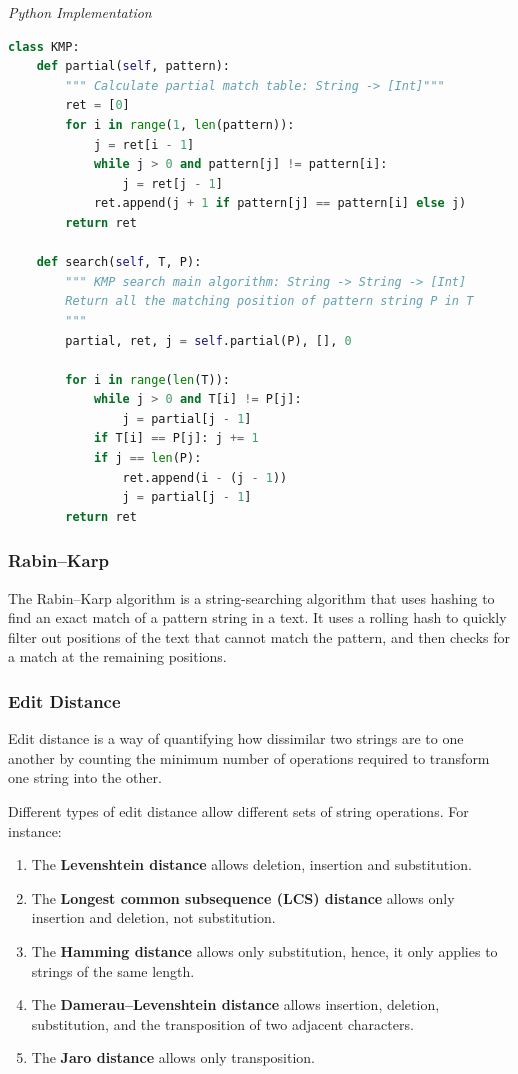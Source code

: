 \documentclass{article}
\begin{document}
\vspace{8pt} \emph{Python Implementation}
\begin{lstlisting}[language=Python]    
class KMP:
    def partial(self, pattern):
        """ Calculate partial match table: String -> [Int]"""
        ret = [0]
        for i in range(1, len(pattern)):
            j = ret[i - 1]
            while j > 0 and pattern[j] != pattern[i]:
                j = ret[j - 1]
            ret.append(j + 1 if pattern[j] == pattern[i] else j)
        return ret
        
    def search(self, T, P):
        """ KMP search main algorithm: String -> String -> [Int] 
        Return all the matching position of pattern string P in T
        """
        partial, ret, j = self.partial(P), [], 0
        
        for i in range(len(T)):
            while j > 0 and T[i] != P[j]:
                j = partial[j - 1]
            if T[i] == P[j]: j += 1
            if j == len(P): 
                ret.append(i - (j - 1))
                j = partial[j - 1]
        return ret
\end{lstlisting}
    
    \subsubsection{Rabin–Karp}
    The Rabin–Karp algorithm is a string-searching algorithm that uses hashing to find an exact match of a pattern string in a text. It uses a rolling hash to quickly filter out positions of the text that cannot match the pattern, and then checks for a match at the remaining positions.

    \subsubsection{Edit Distance}
    Edit distance is a way of quantifying how dissimilar two strings are to one another by counting the minimum number of operations required to transform one string into the other. 

    Different types of edit distance allow different sets of string operations. For instance:
    \begin{enumerate}
        \item The \textbf{Levenshtein distance} allows deletion, insertion and substitution.
        \item The \textbf{Longest common subsequence (LCS) distance} allows only insertion and deletion, not substitution.
        \item The \textbf{Hamming distance} allows only substitution, hence, it only applies to strings of the same length.
        \item The \textbf{Damerau–Levenshtein distance} allows insertion, deletion, substitution, and the transposition of two adjacent characters.
        \item The \textbf{Jaro distance} allows only transposition.
    \end{enumerate}
    
\end{document}
